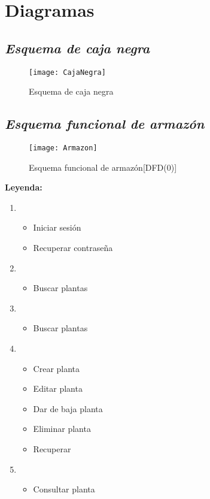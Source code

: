 \documentclass[10pt,a4paper]{article}
\begin{document}
\section{\textbf{Diagramas}}

\subsection{\textbf{\textit{Esquema de caja negra}}}

\begin{figure} [h]
\centering \texttt{[image: CajaNegra]}
\caption{Esquema de caja negra}
\end{figure}

\subsection{\textbf{\textit{Esquema funcional de armazón}}}

\begin{wrapfigure}[11]{l}{10cm}
\texttt{[image: Armazon]}
\caption{Esquema funcional de armazón[DFD(0)]}
\end{wrapfigure}


\textbf{Leyenda:}

	\begin{enumerate} [label=\alph*)]
	\item 
		\medskip
		\begin{itemize}[label=-]
			\item Iniciar sesión
			\item Recuperar contraseña		
		\end{itemize}
	\item 
		\medskip
		\begin{itemize}[label=-]
			\item Buscar plantas		
		\end{itemize}

	\item 
		\medskip
		\begin{itemize}[label=-]
			\item Buscar plantas		
		\end{itemize}
		
	\item 
		\medskip
		\begin{itemize}[label=-]
			\item Crear planta
			\item Editar planta
			\item Dar de baja planta
			\item Eliminar planta
			\item Recuperar	
		\end{itemize}
		
	\item
		\medskip
		\begin{itemize}[label=-]
			\item Consultar planta
		\end{itemize}

	\end{enumerate}
\newpage
\end{document}

